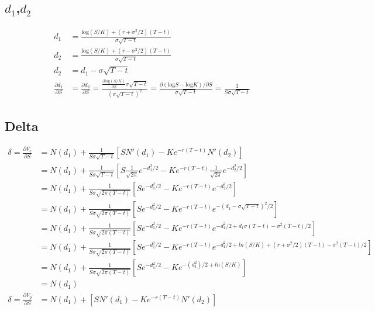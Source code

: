 \documentclass[11pt]{article}
\begin{document}
\subsection{$d_1$,$d_2$}
\begin{align*}
    d_1 &= \frac{\text{log}(S/K) + (r+\sigma^2/2)(T-t)}{\sigma \sqrt{T-t}} \\
    d_2 &= \frac{\text{log}(S/K) + (r-\sigma^2/2)(T-t)}{\sigma \sqrt{T-t}} \\
    d_2 &= d_1 - \sigma \sqrt{T-t} \\
    \frac{\partial d_1}{\partial S} &= \frac{\partial d_2}{\partial S} = \frac{\frac{\partial \text{log}(S/K)}{\partial S} \sigma \sqrt{T-t}}{(\sigma \sqrt{T-t})^2} = \frac{\partial (\text{log} S - \text{log} K)/\partial S}{\sigma\sqrt{T-t}} = \frac{1}{S\sigma\sqrt{T-t}}
\end{align*}


\subsection{Delta}

\begin{align*}
    \delta = \frac{\partial V_c}{\partial S} &= N(d_1)+\frac{1}{S\sigma\sqrt{T-t}} 
    \left[
        SN'(d_1)-Ke^{-r(T-t)}N'(d_2)
    \right]\\
    &= N(d_1)+\frac{1}{S\sigma\sqrt{T-t}}
    \left[
        S\frac{1}{\sqrt{2\pi}}e^{-d_1^2/2}-Ke^{-r(T-t)}\frac{1}{\sqrt{2\pi}}e^{-d_2^2/2}
    \right]\\
    &= N(d_1)+\frac{1}{S\sigma\sqrt{2\pi(T-t)}}
    \left[
        S e^{-d_1^2/2}-Ke^{-r(T-t)}e^{-d_2^2/2}
    \right]\\
    &= N(d_1)+\frac{1}{S\sigma\sqrt{2\pi(T-t)}}
    \left[
        S e^{-d_1^2/2}-Ke^{-r(T-t)} e^{-(d_1-\sigma\sqrt{T-t})^2/2}
    \right]\\
    &= N(d_1)+\frac{1}{S\sigma\sqrt{2\pi(T-t)}}
    \left[
        S e^{-d_1^2/2}-Ke^{-r(T-t)} e^{-d_1^2/2 + d_1\sigma(T-t) - \sigma^2 (T-t)/2}
    \right]\\
    &= N(d_1)+\frac{1}{S\sigma\sqrt{2\pi(T-t)}}
    \left[
        S e^{-d_1^2/2}-Ke^{-r(T-t)} e^{-d_1^2/2 + ln(S/K) + (r+\sigma^2/2)(T-t) - \sigma^2 (T-t)/2}
    \right]\\
    &= N(d_1)+\frac{1}{S\sigma\sqrt{2\pi(T-t)}}
    \left[
        S e^{-d_1^2/2}-K e^{-(d_1^2)/2+ ln(S/K)}
    \right]\\
    &= N(d_1) \\
    \delta = \frac{\partial V_p}{\partial S} &= N(d_1) + 
    \left[
        SN'(d_1)-Ke^{-r(T-t)}N'(d_2)
    \right]\\
\end{align*}
\end{document}
